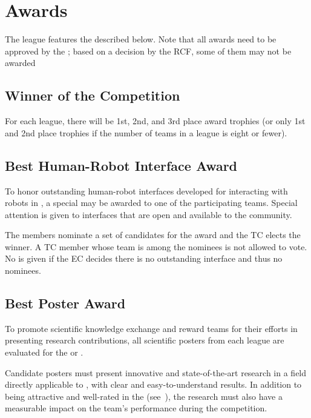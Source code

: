 \section{Awards}\label{sec:awards}

The \AtHome{} league features the  described below.
Note that all awards need to be approved by the \RCF{}; based on a decision by the RCF, some of them may not be awarded

\subsection{Winner of the Competition}\label{award:winner}

For each league, there will be 1st, 2nd, and 3rd place award trophies (or only 1st and 2nd place trophies if the number of teams in a league is eight or fewer).

\subsection{Best Human-Robot Interface Award}\label{award:hri}

To honor outstanding human-robot interfaces developed for interacting with robots in \AtHome{}, a special \HRIAward{} may be awarded to one of the participating teams.
Special attention is given to interfaces that are open and available to the \AtHome{} community.

The \AtHome{} \EC{} members nominate a set of candidates for the award and the TC elects the winner.
A TC member whose team is among the nominees is not allowed to vote.
No \HRIAward{} is given if the EC decides there is no outstanding interface and thus no nominees.

\subsection{Best Poster Award}\label{award:poster}

To promote scientific knowledge exchange and reward teams for their efforts in presenting research contributions, all scientific posters from each league are evaluated for the \DSPLPosterAward{} or \OPLPosterAward{}.

Candidate posters must present innovative and state-of-the-art research in a field directly applicable to \AtHome{}, with clear and easy-to-understand results.
In addition to being attractive and well-rated in the \PS{} (see~), the research must also have a measurable impact on the team's performance during the competition.

